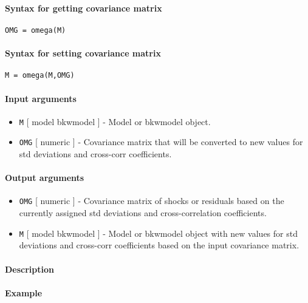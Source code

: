 


	\paragraph{Syntax for getting covariance
matrix}\label{syntax-for-getting-covariance-matrix}

\begin{verbatim}
OMG = omega(M)
\end{verbatim}

\paragraph{Syntax for setting covariance
matrix}\label{syntax-for-setting-covariance-matrix}

\begin{verbatim}
M = omega(M,OMG)
\end{verbatim}

\paragraph{Input arguments}\label{input-arguments}

\begin{itemize}
\item
  \texttt{M} {[} model \textbar{} bkwmodel {]} - Model or bkwmodel
  object.
\item
  \texttt{OMG} {[} numeric {]} - Covariance matrix that will be
  converted to new values for std deviations and cross-corr
  coefficients.
\end{itemize}

\paragraph{Output arguments}\label{output-arguments}

\begin{itemize}
\item
  \texttt{OMG} {[} numeric {]} - Covariance matrix of shocks or
  residuals based on the currently assigned std deviations and
  cross-correlation coefficients.
\item
  \texttt{M} {[} model \textbar{} bkwmodel {]} - Model or bkwmodel
  object with new values for std deviations and cross-corr coefficients
  based on the input covariance matrix.
\end{itemize}

\paragraph{Description}\label{description}

\paragraph{Example}\label{example}


